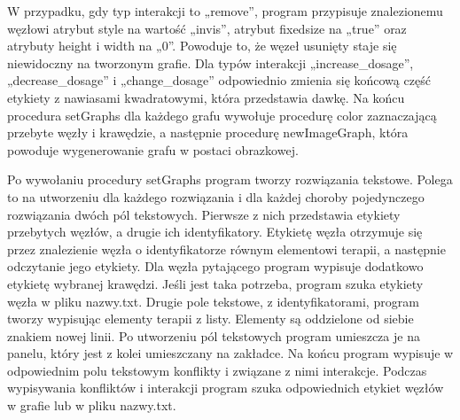 W przypadku, gdy typ interakcji to „remove”, program przypisuje znalezionemu węzłowi atrybut style na wartość „invis”, atrybut fixedsize na „true” oraz atrybuty height i width na „0”. Powoduje to, że węzeł usunięty staje się niewidoczny na tworzonym grafie. Dla typów interakcji „increase\_dosage”, „decrease\_dosage” i „change\_dosage” odpowiednio zmienia się końcową część etykiety z nawiasami kwadratowymi, która przedstawia dawkę. Na końcu procedura setGraphs dla każdego grafu wywołuje procedurę color zaznaczającą przebyte węzły i krawędzie, a następnie procedurę newImageGraph, która powoduje wygenerowanie grafu w postaci obrazkowej. 

Po wywołaniu procedury setGraphs program tworzy rozwiązania tekstowe. Polega to na utworzeniu dla każdego rozwiązania i dla każdej choroby pojedynczego rozwiązania dwóch pól tekstowych. Pierwsze z nich przedstawia etykiety przebytych węzłów, a drugie ich identyfikatory. 
Etykietę węzła otrzymuje się przez znalezienie węzła o identyfikatorze równym elementowi terapii, a następnie odczytanie jego etykiety. Dla węzła pytającego program wypisuje dodatkowo etykietę wybranej krawędzi. Jeśli jest taka potrzeba, program szuka etykiety węzła w pliku nazwy.txt. Drugie pole tekstowe, z identyfikatorami, program tworzy wypisując elementy terapii z listy. Elementy są oddzielone od siebie znakiem nowej linii. 
Po utworzeniu pól tekstowych program umieszcza je na panelu, który jest z kolei umieszczany na zakładce. Na końcu program wypisuje w odpowiednim polu tekstowym konflikty i związane z nimi interakcje. Podczas wypisywania konfliktów i interakcji program szuka odpowiednich etykiet węzłów w grafie lub w pliku nazwy.txt. 

